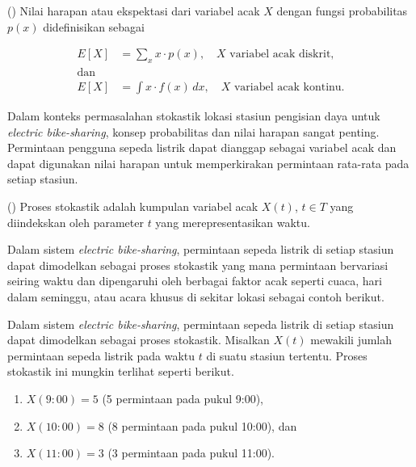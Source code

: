 \begin{definisi}()
    Nilai harapan atau ekspektasi dari variabel acak $X$ dengan fungsi probabilitas $p(x)$ didefinisikan sebagai
    
    \begin{align*}
        E[X] &= \sum_{x} x \cdot p(x), \quad X \text{ variabel acak diskrit}, \\
        \text{dan}\\
        E[X] &= \int x \cdot f(x) \, dx, \quad X \text{ variabel acak kontinu}.
    \end{align*}
\end{definisi}

Dalam konteks permasalahan stokastik lokasi stasiun pengisian daya untuk \textit{electric bike-sharing}, konsep probabilitas dan nilai harapan sangat penting. Permintaan pengguna sepeda listrik dapat dianggap sebagai variabel acak dan dapat digunakan nilai harapan untuk memperkirakan permintaan rata-rata pada setiap stasiun.

\begin{definisi}()
    Proses stokastik adalah kumpulan variabel acak $X(t)$, $t\in T$ yang diindekskan oleh parameter $t$ yang merepresentasikan waktu.
\end{definisi}

Dalam sistem \textit{electric bike-sharing}, permintaan sepeda listrik di setiap stasiun dapat dimodelkan sebagai proses stokastik yang mana permintaan bervariasi seiring waktu dan dipengaruhi oleh berbagai faktor acak seperti cuaca, hari dalam seminggu, atau acara khusus di sekitar lokasi sebagai contoh berikut.

\begin{contoh}
    Dalam sistem \textit{electric bike-sharing}, permintaan sepeda listrik di setiap stasiun dapat dimodelkan sebagai proses stokastik. Misalkan $X(t)$ mewakili jumlah permintaan sepeda listrik pada waktu $t$ di suatu stasiun tertentu. Proses stokastik ini mungkin terlihat seperti berikut.
    \begin{enumerate}
        \item $X(9:00) = 5$ (5 permintaan pada pukul 9:00),
        \item $X(10:00) = 8$ (8 permintaan pada pukul 10:00), dan
        \item $X(11:00) = 3$ (3 permintaan pada pukul 11:00).
    \end{enumerate}
\end{contoh}

